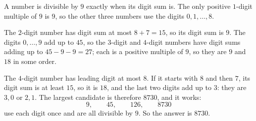 A number is divisible by $9$ exactly when its digit sum is. The only positive $1$-digit multiple of $9$ is $9$, so the other three numbers use the digits $0,1,\dots,8$.

The $2$-digit number has digit sum at most $8+7=15$, so its digit sum is $9$. The digits $0,\dots,9$ add up to $45$, so the $3$-digit and $4$-digit numbers have digit sums adding up to $45-9-9=27$; each is a positive multiple of $9$, so they are $9$ and $18$ in some order.

The $4$-digit number has leading digit at most $8$. If it starts with $8$ and then $7$, its digit sum is at least $15$, so it is $18$, and the last two digits add up to $3$: they are $3,0$ or $2,1$. The largest candidate is therefore $8730$, and it works:
\[9,\qquad45,\qquad126,\qquad8730\]
use each digit once and are all divisible by $9$. So the answer is $\boxed{8730}$.
